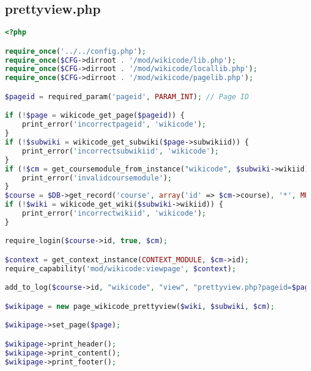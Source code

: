 \subsection{prettyview.php}
\begin{lstlisting}[language=PHP]
<?php

require_once('../../config.php');
require_once($CFG->dirroot . '/mod/wikicode/lib.php');
require_once($CFG->dirroot . '/mod/wikicode/locallib.php');
require_once($CFG->dirroot . '/mod/wikicode/pagelib.php');

$pageid = required_param('pageid', PARAM_INT); // Page ID

if (!$page = wikicode_get_page($pageid)) {
    print_error('incorrectpageid', 'wikicode');
}
if (!$subwiki = wikicode_get_subwiki($page->subwikiid)) {
    print_error('incorrectsubwikiid', 'wikicode');
}
if (!$cm = get_coursemodule_from_instance("wikicode", $subwiki->wikiid)) {
    print_error('invalidcoursemodule');
}
$course = $DB->get_record('course', array('id' => $cm->course), '*', MUST_EXIST);
if (!$wiki = wikicode_get_wiki($subwiki->wikiid)) {
    print_error('incorrectwikiid', 'wikicode');
}

require_login($course->id, true, $cm);

$context = get_context_instance(CONTEXT_MODULE, $cm->id);
require_capability('mod/wikicode:viewpage', $context);

add_to_log($course->id, "wikicode", "view", "prettyview.php?pageid=$pageid", "$wiki->id");

$wikipage = new page_wikicode_prettyview($wiki, $subwiki, $cm);

$wikipage->set_page($page);

$wikipage->print_header();
$wikipage->print_content();
$wikipage->print_footer();
\end{lstlisting}

